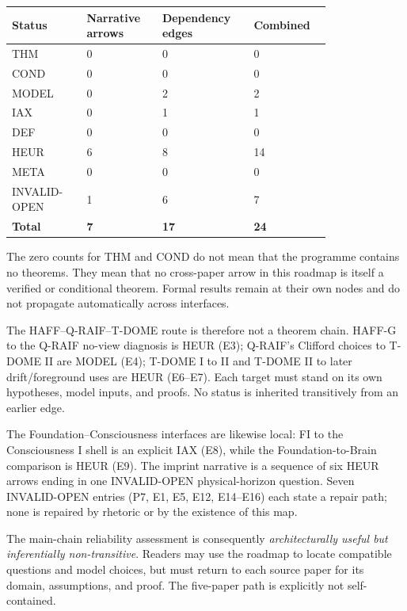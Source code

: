 \documentclass[12pt,a4paper]{article}
\begin{document}
\begin{center}
\begin{tabular}{P{0.20\linewidth}P{0.20\linewidth}P{0.22\linewidth}P{0.18\linewidth}}
\toprule
\textbf{Status} & \textbf{Narrative arrows} & \textbf{Dependency edges} & \textbf{Combined} \\
\midrule
THM & 0 & 0 & 0 \\
COND & 0 & 0 & 0 \\
MODEL & 0 & 2 & 2 \\
IAX & 0 & 1 & 1 \\
DEF & 0 & 0 & 0 \\
HEUR & 6 & 8 & 14 \\
META & 0 & 0 & 0 \\
INVALID-OPEN & 1 & 6 & 7 \\
\midrule
\textbf{Total} & \textbf{7} & \textbf{17} & \textbf{24} \\
\bottomrule
\end{tabular}
\end{center}

The zero counts for THM and COND do not mean that the programme contains
no theorems. They mean that no cross-paper arrow in this roadmap is itself
a verified or conditional theorem. Formal results remain at their own
nodes and do not propagate automatically across interfaces.

The HAFF--Q-RAIF--T-DOME route is therefore not a theorem chain.
HAFF-G to the Q-RAIF no-view diagnosis is HEUR (E3);
Q-RAIF's Clifford choices to T-DOME II are MODEL (E4);
T-DOME I to II and T-DOME II to later drift/foreground uses are HEUR
(E6--E7). Each target must stand on its own hypotheses, model inputs, and
proofs. No status is inherited transitively from an earlier edge.

The Foundation--Consciousness interfaces are likewise local: FI to the
Consciousness I shell is an explicit IAX (E8), while the Foundation-to-Brain
comparison is HEUR (E9). The imprint narrative is a sequence of six HEUR
arrows ending in one INVALID-OPEN physical-horizon question. Seven
INVALID-OPEN entries (P7, E1, E5, E12, E14--E16) each state a repair path;
none is repaired by rhetoric or by the existence of this map.

The main-chain reliability assessment is consequently
\emph{architecturally useful but inferentially non-transitive}. Readers
may use the roadmap to locate compatible questions and model choices, but
must return to each source paper for its domain, assumptions, and proof.
The five-paper path is explicitly not self-contained.
\end{document}
